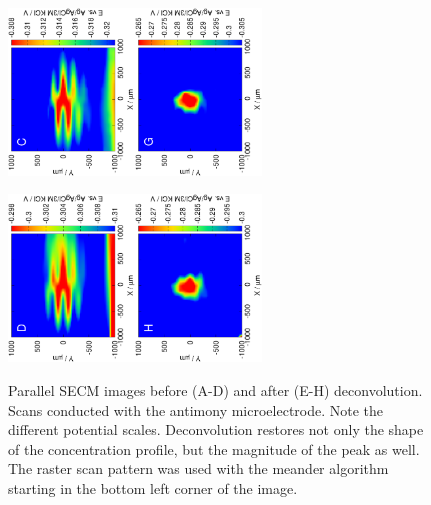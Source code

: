 \begin{figure}
\includegraphics[trim = 10mm 30mm 0mm 10mm, clip, width=0.3\textwidth, angle=-90]{img/pH_2D_Sb/13121315.eps}\includegraphics[trim = 10mm 30mm 0mm 10mm, clip, width=0.3\textwidth, angle=-90]{img/pH_2D_Sb/13121315_deconvoluted.eps}

\includegraphics[trim = 10mm 30mm 0mm 10mm, clip, width=0.3\textwidth, angle=-90]{img/pH_2D_Sb/13121316.eps}\includegraphics[trim = 10mm 30mm 0mm 10mm, clip, width=0.3\textwidth, angle=-90]{img/pH_2D_Sb/13121316_deconvoluted.eps}

\caption[Parallel SECM images before and after the deconvolution.
Scans conducted with the antimony microelectrode.]{Parallel SECM images before (A-D) and after (E-H) deconvolution.
Scans conducted with the antimony microelectrode.
Note the different potential scales.
Deconvolution restores not only the shape of the concentration profile, but the magnitude of the peak as well.
The raster scan pattern was used with the meander algorithm starting in the bottom left corner of the image.}
\label{fig:deconvolution}
\end{figure}
